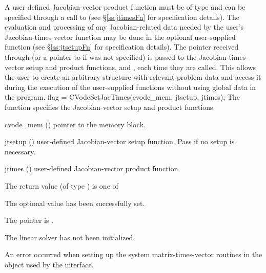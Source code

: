 A user-defined Jacobian-vector product
function must be of type  and
can be specified through a call to  (see
\S\ref{ss:jtimesFn} for specification details).
The evaluation and processing of any Jacobian-related data needed by
the user's Jacobian-times-vector function may be done in the optional
user-supplied function  (see \S\ref{ss:jtsetupFn} for
specification details).
%
The pointer  received through  (or
a pointer to  if  was not specified)
is passed to the Jacobian-times-vector setup and product functions,  and
, each time they are called.  This allows the user to
create an arbitrary structure with relevant problem data and access it
during the execution of the user-supplied functions
without using global data in the program.
{
  flag = CVodeSetJacTimes(cvode\_mem, jtsetup, jtimes);
}
{
  The function  specifies the Jacobian-vector
  setup and product functions.
}
{
  \begin{args}
  \item[cvode\_mem] ()
    pointer to the {\cvodes} memory block.
  \item[jtsetup] ()
    user-defined Jacobian-vector setup function.
    Pass  if no setup is necessary.
  \item[jtimes] ()
    user-defined Jacobian-vector product function.
  \end{args}
}
{
  The return value  (of type ) is one of
  \begin{args}
  \item[\Id{CVLS\_SUCCESS}]
    The optional value has been successfully set.
  \item[\Id{CVLS\_MEM\_NULL}]
    The  pointer is .
  \item[\Id{CVLS\_LMEM\_NULL}]
    The {\cvls} linear solver has not been initialized.
  \item[\Id{CVLS\_SUNLS\_FAIL}]
    An error occurred when setting up the system matrix-times-vector
    routines in the {\sunlinsol} object used by the {\cvls}
    interface.
  \end{args}
}
